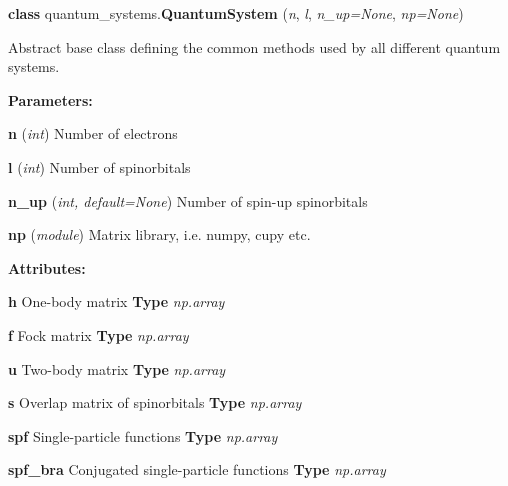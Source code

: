 \begin{tcolorbox}
    {\selectfont
    \textbf{class} quantum\_systems.\textbf{QuantumSystem}
    (\emph{n}, \emph{l}, \emph{n\_up=None}, \emph{np=None})

    \vspace{1em}
    Abstract base class defining the common methods used by all different quantum systems.

    \vspace{1em}
    \textbf{Parameters:} 

    \hspace{2em} \textbf{n} (\emph{int}) Number of electrons
    
    \hspace{2em} \textbf{l} (\emph{int}) Number of spinorbitals

    \hspace{2em} \textbf{n\_up} (\emph{int, default=None}) Number of spin-up spinorbitals

    \hspace{2em} \textbf{np} (\emph{module}) Matrix library, i.e. numpy, cupy etc.

    \vspace{1em}
    \textbf{Attributes:}

    \hspace{2em} \textbf{h}
    One-body matrix 
    \textbf{Type} \emph{np.array}
    
    \hspace{2em} \textbf{f}
    Fock matrix
    \textbf{Type} \emph{np.array}

    \hspace{2em} \textbf{u}
    Two-body matrix
    \textbf{Type} \emph{np.array}

    \hspace{2em} \textbf{s}
    Overlap matrix of spinorbitals
    \textbf{Type} \emph{np.array}
    
    \hspace{2em} \textbf{spf}
    Single-particle functions
    \textbf{Type} \emph{np.array}

    \hspace{2em} \textbf{spf\_bra}
    Conjugated single-particle functions
    \textbf{Type} \emph{np.array}



}
\end{tcolorbox}
